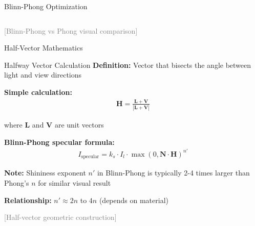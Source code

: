 \begin{frame}{Blinn-Phong Optimization}
\begin{columns}
\begin{column}{0.5\textwidth}
    \end{column}
  \end{columns}

  \vspace{0.3cm}
  \pause
  \begin{center}
    \textcolor{gray}{[Blinn-Phong vs Phong visual comparison]}
  \end{center}
\end{frame}

\begin{frame}{Half-Vector Mathematics}
  \begin{mathbox}{Halfway Vector Calculation}
    \textbf{Definition:} Vector that bisects the angle between light and view directions

    \vspace{0.3cm}
    \textbf{Simple calculation:}
    \begin{align}
      \mathbf{H} = \frac{\mathbf{L} + \mathbf{V}}{|\mathbf{L} + \mathbf{V}|}
    \end{align}

    where $\mathbf{L}$ and $\mathbf{V}$ are unit vectors

    \vspace{0.3cm}
    \pause
    \textbf{Blinn-Phong specular formula:}
    \begin{align}
      I_{\text{specular}} = k_s \cdot I_l \cdot \max(0, \mathbf{N} \cdot \mathbf{H})^{n'}
    \end{align}

    \pause
    \textbf{Note:} Shininess exponent $n'$ in Blinn-Phong is typically 2-4 times larger than Phong's $n$ for similar visual result

    \vspace{0.3cm}
    \textbf{Relationship:} $n' \approx 2n$ to $4n$ (depends on material)
  \end{mathbox}

  \vspace{0.3cm}
  \pause
  \textcolor{gray}{[Half-vector geometric construction]}
\end{frame}

